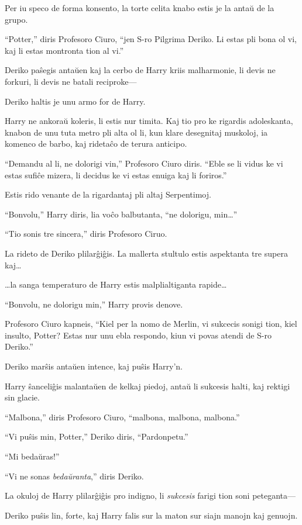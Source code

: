 Per iu speco de forma konsento, la torte celita knabo estis je la antaŭ de la grupo.

``Potter,'' diris Profesoro Ciuro, ``jen S-ro Pilgrima Deriko. Li
estas pli bona ol vi, kaj li estas montronta tion al vi.''

Deriko paŝegis antaŭen kaj la cerbo de Harry kriis malharmonie, li
devis ne forkuri, li devis ne batali reciproke—

Deriko haltis je unu armo for de Harry.

Harry ne ankoraŭ koleris, li estis nur timita. Kaj tio pro ke rigardis
adoleskanta, knabon de unu tuta metro pli alta ol li, kun klare
desegnitaj muskoloj, ia komenco de barbo, kaj ridetaĉo de terura
anticipo.

``Demandu al li, ne dolorigi vin,'' Profesoro Ciuro diris. ``Eble se
li vidus ke vi estas sufiĉe mizera, li decidus ke vi estas enuiga kaj
li foriros.''

Estis rido venante de la rigardantaj pli altaj Serpentimoj.

``Bonvolu,'' Harry diris, lia voĉo balbutanta, ``ne dolorigu, min\ldots''

``Tio sonis tre sincera,'' diris Profesoro Ciruo.

La rideto de Deriko plilarĝiĝis. La mallerta stultulo estis aspektanta
tre supera kaj\ldots

\ldots la sanga temperaturo de Harry estis malplialtiganta rapide\ldots

``Bonvolu, ne dolorigu min,'' Harry provis denove.

Profesoro Ciuro kapneis, ``Kiel per la nomo de Merlin, vi sukcecis
sonigi tion, kiel insulto, Potter? Estas nur unu ebla respondo, kiun
vi povas atendi de S-ro Deriko.''

Deriko marŝis antaŭen intence, kaj puŝis Harry'n.

Harry ŝanceliĝis malantaŭen de kelkaj piedoj, antaŭ li sukcesis halti,
kaj rektigi sin glacie.

``Malbona,'' diris Profesoro Ciuro, ``malbona, malbona, malbona.''

``Vi puŝis min, Potter,'' Deriko diris, ``Pardonpetu.''

``Mi bedaŭras!''

``Vi ne sonas \emph{bedaŭranta},'' diris Deriko.

La okuloj de Harry plilarĝiĝis pro indigno, li \emph{sukcesis} farigi
tion soni peteganta—

Deriko puŝis lin, forte, kaj Harry falis sur la maton sur siajn manojn
kaj genuojn.

